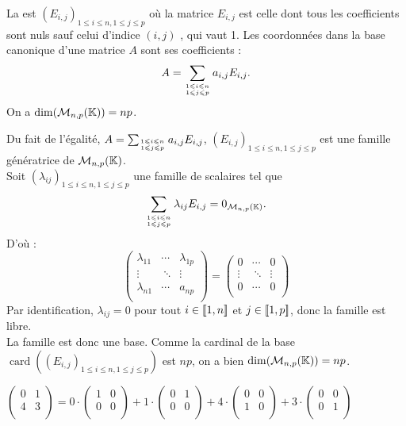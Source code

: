 \documentclass{book}
\begin{document}
\begin{Proposition}La  est $(E_{i,j})_{1\leqslant i\leqslant n, 1\leqslant j\leqslant p}$ où la matrice  $E_{i,j}$ est celle dont tous les coefficients sont nuls sauf celui d'indice $(i,j)$ , qui vaut 1. Les coordonnées dans la base canonique d'une matrice $A$ sont ses coefficients :$$ A = \sum _{1\leqslant i\leqslant n\atop 1\leqslant j\leqslant p}  a_{i,j} E_{i,j}.$$
On a $\dim( \mathcal{M}_{n,p}(\mathbb{K}))=np$.
\end{Proposition}
\begin{Demonstration}
Du fait de l'égalité, $ A = \sum _{1\leqslant i\leqslant n\atop 1\leqslant j\leqslant p}  a_{i,j} E_{i,j}$,  $(E_{i,j})_{1\leqslant i\leqslant n, 1\leqslant j\leqslant p}$ est une famille génératrice de $\mathcal{M}_{n,p}(\mathbb{K})$.\\
Soit  $(\lambda_{ij})_{1\leqslant i\leqslant n, 1\leqslant j\leqslant p}$ une famille de scalaires tel que
$$\sum _{1\leqslant i\leqslant n\atop 1\leqslant j\leqslant p}  \lambda_{ij} E_{i,j}=0_{\mathcal{M}_{n,p}(\mathbb{K})}.$$
D'où :
 $$\begin{pmatrix}
\lambda_{11} &  \cdots & \lambda_{1p}\\
\vdots & \ \ddots & \vdots\\
\lambda_{n1} &  \cdots & a_{np}\\
\end{pmatrix}= \begin{pmatrix}
0 &  \cdots &0\\
\vdots & \ \ddots & \vdots\\
0 &  \cdots & 0\\
\end{pmatrix}$$
Par identification, $\lambda_{ij}=0$ pour tout $i\in\mathopen\lbrack\!\lbrack1,n \mathclose\rbrack\!\rbrack$ et  $j\in\mathopen\lbrack\!\lbrack1,p \mathclose\rbrack\!\rbrack$, donc la famille est libre.\\
La famille est donc une base. Comme la cardinal de la base $\operatorname{card}((E_{i,j})_{1\leqslant i\leqslant n, 1\leqslant j\leqslant p})$ est $np$, on a bien $\dim( \mathcal{M}_{n,p}(\mathbb{K}))=np$.
\end{Demonstration}
\begin{Exemple}$ \begin{pmatrix}
0 &1  \\
4 & 3 \\
\end{pmatrix} =
0\cdot
\begin{pmatrix}
1 &0  \\
0 & 0  \\
\end{pmatrix}
+
1\cdot
\begin{pmatrix}
0 &1  \\
0 & 0 \\
\end{pmatrix}
+
4\cdot
\begin{pmatrix}
0 &0  \\
1 & 0  \\
\end{pmatrix}
+
3\cdot
\begin{pmatrix}
0 &0  \\
0 & 1  \\
\end{pmatrix}
$
\end{Exemple}
\end{document}
